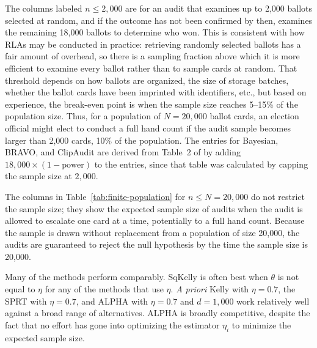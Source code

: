 \documentclass[12pt,runningheads]{llncs}
\begin{document}
{The columns labeled $n \le 2{,}000$ are for an audit that examines up to 2,000 ballots selected at random, and
if the outcome has not been confirmed by then, examines the remaining 18,000 ballots to determine who won.
This is consistent with how RLAs may be conducted in practice: retrieving randomly selected ballots has a fair amount of 
overhead, so there is a sampling fraction above which it is more efficient to examine every ballot rather than to sample cards
at random.
That threshold depends on how ballots are organized, the size of storage batches, whether the ballot cards have been
imprinted with identifiers, etc., but based on experience, the break-even point 
is when the sample size reaches 5--15\% of the
population size.
Thus, for a population of $N=20{,}000$ ballot cards, an election official might elect to conduct a full hand count
if the audit sample becomes larger than 2,000 cards, 10\% of the population. 
The entries for Bayesian, BRAVO, and ClipAudit are derived from Table~2 of \cite{huangEtal20} by adding 
$18,000 \times (1-\mbox{power})$ to the entries, since that table was calculated by capping the sample size
at $2,000$.

The columns in Table~\ref{tab:finite-population}  for $n \le N = 20{,}000$ do not restrict the sample size;
they show the expected sample size of audits when the audit is allowed to escalate one card at a time,
potentially to a full hand count.
Because the sample is drawn without replacement from a population of size 20,000, the audits are guaranteed to reject the
null hypothesis by the time the sample size is 20,000.

Many of the methods perform comparably. 
SqKelly is often best when $\theta$ is not equal to $\eta$ for any of the methods that
use $\eta$.
\emph{A priori} Kelly with $\eta=0.7$, the SPRT with $\eta=0.7$, and ALPHA with $\eta=0.7$ and $d=1{,}000$
work relatively well against a broad range of alternatives.
ALPHA is broadly competitive, despite the fact that no effort has gone into optimizing the estimator $\eta_i$ to minimize
the expected sample size.

}
\end{document}
